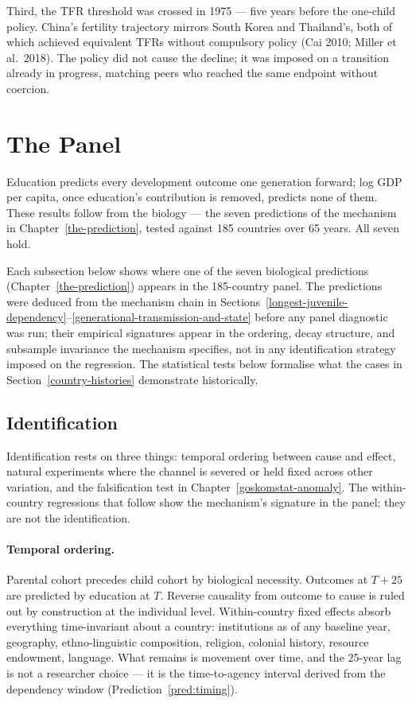 \documentclass[12pt,letterpaper]{article}
\begin{document}
Third, the TFR threshold was crossed in
1975 --- five years before the one-child policy. China's
fertility trajectory mirrors South Korea and Thailand's, both of
which achieved equivalent TFRs without compulsory policy (Cai 2010; Miller et
al.~2018). The policy did not cause the decline; it was imposed on a
transition already in progress, matching peers who reached the same
endpoint without coercion.

\section{The Panel}\label{the-panel}

Education predicts every development outcome one generation forward; log GDP per capita, once education's contribution is removed, predicts none of them. These results follow from the biology --- the seven predictions of the mechanism in Chapter~\ref{the-prediction}, tested against 185 countries over 65 years. All seven hold.

Each subsection below shows where one of the seven biological
predictions (Chapter~\ref{the-prediction}) appears in the 185-country
panel. The predictions were deduced from the mechanism chain in
Sections~\ref{longest-juvenile-dependency}--\ref{generational-transmission-and-state} before
any panel diagnostic was run; their empirical signatures appear in the
ordering, decay structure, and subsample invariance the mechanism
specifies, not in any identification strategy imposed on the
regression. The statistical tests below formalise what the cases in
Section~\ref{country-histories} demonstrate historically.

\subsection{Identification}\label{identification}

Identification rests on three things: temporal ordering between cause
and effect, natural experiments where the channel is severed or held
fixed across other variation, and the falsification test in
Chapter~\ref{goskomstat-anomaly}. The within-country regressions that
follow show the mechanism's signature in the panel; they are not the
identification.

\paragraph{Temporal ordering.} Parental cohort precedes child cohort
by biological necessity. Outcomes at $T+25$ are predicted by education
at $T$. Reverse causality from outcome to cause is ruled out by
construction at the individual level. Within-country fixed effects
absorb everything time-invariant about a country: institutions as of
any baseline year, geography, ethno-linguistic composition, religion,
colonial history, resource endowment, language. What remains is
movement over time, and the 25-year lag is not a researcher choice ---
it is the time-to-agency interval derived from the dependency window
(Prediction~\ref{pred:timing}).
\end{document}
